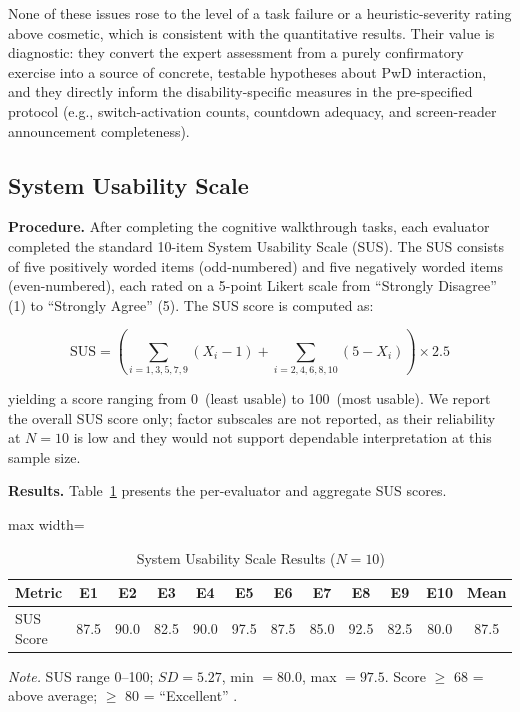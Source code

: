\documentclass[journal,onecolumn]{IEEEtran}
\begin{document}
None of these issues rose to the level of a task failure or a heuristic-severity rating above cosmetic, which is consistent with the quantitative results. Their value is diagnostic: they convert the expert assessment from a purely confirmatory exercise into a source of concrete, testable hypotheses about PwD interaction, and they directly inform the disability-specific measures in the pre-specified protocol (e.g., switch-activation counts, countdown adequacy, and screen-reader announcement completeness).

\subsection{System Usability Scale}
\label{subsec:sus}

\noindent\textbf{Procedure.} 
After completing the cognitive walkthrough tasks, each evaluator
completed the standard 10-item System Usability Scale
(SUS)\cite{brooke1996sus}. The SUS consists of five positively worded
items (odd-numbered) and five negatively worded items (even-numbered),
each rated on a 5-point Likert scale from ``Strongly Disagree'' (1) to
``Strongly Agree'' (5). The SUS score is computed as:

\begin{equation}
\text{SUS} = \left(\sum_{i=1,3,5,7,9}(X_i - 1) + \sum_{i=2,4,6,8,10}(5 - X_i)\right) \times 2.5
\end{equation}

yielding a score ranging from 0~(least usable) to 100~(most usable).
We report the overall SUS score only; factor subscales are not reported,
as their reliability at $N=10$ is low and they would not support
dependable interpretation at this sample size.

\noindent\textbf{Results.} 
Table~\ref{tab:sus-results} presents the per-evaluator and aggregate SUS scores.

\begin{table}[htbp]
\centering
\caption{System Usability Scale Results ($N=10$)}
\label{tab:sus-results}
\small
\begin{adjustbox}{max width=\columnwidth}
\begin{tabular}{|p{2.4cm}|*{10}{c|}c|}
\hline
\textbf{Metric} & \textbf{E1} & \textbf{E2} & \textbf{E3} & \textbf{E4} & \textbf{E5} & \textbf{E6} & \textbf{E7} & \textbf{E8} & \textbf{E9} & \textbf{E10} & \textbf{Mean} \\
\hline
SUS Score & 87.5 & 90.0 & 82.5 & 90.0 & 97.5 & 87.5 & 85.0 & 92.5 & 82.5 & 80.0 & 87.5 \\
\hline
\end{tabular}
\end{adjustbox}
{\footnotesize\textit{Note.} SUS range 0--100; $SD = 5.27$, min $=80.0$, max $=97.5$. Score $\geq$ 68 = above average; $\geq$ 80 = ``Excellent'' \cite{bangor2008empirical}.}
\end{table}
\end{document}

